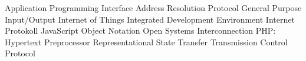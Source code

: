 \begin{acronym}[Bash]
  {Application Programming Interface}
  {Address Resolution Protocol}
  {General Purpose Input/Output}
  {Internet of Things}
  {Integrated Development Environment}
  {Internet Protokoll}
  {JavaScript Object Notation}
  {Open Systems Interconnection}
  {PHP: Hypertext Preprocessor}
  {Representational State Transfer}
  {Transmission Control Protocol}
\end{acronym}
